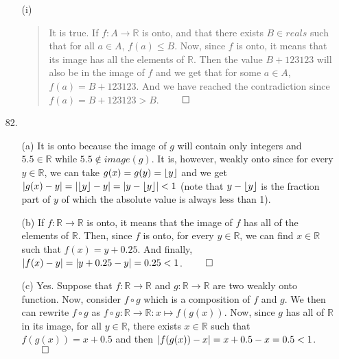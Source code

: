 \documentclass[12pt, a4paper]{article}
\newcommand{\reals}{\mathbb{R}}
\newcommand\und[1]{\underline{\smash{#1}}}
\DeclarePairedDelimiter\abs{\lvert}{\rvert}
\DeclarePairedDelimiter\floor{\lfloor}{\rfloor}
\newcommand{\rarr}{\rightarrow}
\begin{document}
\begin{itemize}
\begin{itemize}
\item[]

\item[(i)]
\begin{quote}
It is true. If $f : A \rarr \reals$ is onto, and that there exists $B \in reals$ such that for all $a \in A$, $f(a) \leq B$.
Now, since $f$ is onto, it means that its image has all the elements of $\reals$. Then the value $B + 123123$ will also be in
the image of $f$ and we get that for some $a \in A$, $f(a) = B + 123123$. And we have reached the contradiction since $f(a) = B + 123123 > B$.
$\qed$
\end{quote}
\end{itemize}

\item[]
\item[]
\item[]

\item[82.]
\begin{itemize}
\item[(a)]
It is \und{NOT} onto because the image of $g$ will contain only integers
and $5.5 \in \reals$ while $5.5 \notin image(g)$. It is, however, weakly onto
since for every $y \in \reals$, we can take $g(x) = g(y) = \floor{y}$ and we get
$\abs{g(x) - y} = \abs{\floor{y} - y} = \abs{y - \floor{y}}  < 1$ (note that $y - \floor{y}$ is the fraction
part of $y$ of which the absolute value is always less than 1).

\item[]

\item[(b)]
If $f : \reals \rarr \reals$ is onto, it means that the image of $f$ has all of the elements
of $\reals$. Then, since $f$ is onto, for every $y \in \reals$, we can find $x \in \reals$ such that $f(x) = y + 0.25$.
And finally, $\abs{f(x) - y} = \abs{y + 0.25 - y} = 0.25 < 1$.
$\qed$

\item[]

\item[(c)]
Yes. Suppose that $f : \reals \rarr \reals$ and $g : \reals \rarr \reals$
are two weakly onto function. Now, consider $f \circ g$ which is a composition
of $f$ and $g$. We then can rewrite $f \circ g$ as $f \circ g : \reals \rarr \reals : x \mapsto f(g(x))$.
Now, since $g$ has all of $\reals$ in its image, for all $y \in \reals$, there exists
$x \in \reals$ such that $f(g(x)) = x + 0.5$ and then $\abs{f(g(x)) - x} = x + 0.5 - x = 0.5 < 1$.
$\qed$


\end{itemize}
\end{itemize}
\end{document}
